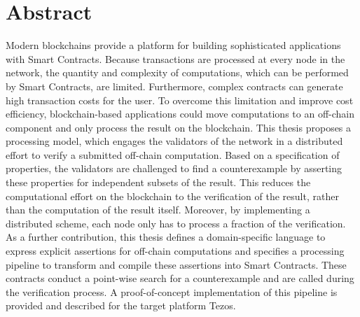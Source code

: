 \chapter*{Abstract}
Modern blockchains provide a platform for building sophisticated applications with Smart Contracts. Because transactions are processed at every node in the network, the quantity and complexity of computations, which can be performed by Smart Contracts, are limited. Furthermore, complex contracts can generate high transaction costs for the user. To overcome this limitation and improve cost efficiency, blockchain-based applications could move computations to an off-chain component and only process the result on the blockchain. This thesis proposes a processing model, which engages the validators of the network in a distributed effort to verify a submitted off-chain computation. Based on a specification of properties, the validators are challenged to find a counterexample by asserting these properties for independent subsets of the result. This reduces the computational effort on the blockchain to the verification of the result, rather than the computation of the result itself. Moreover, by implementing a distributed scheme, each node  only has to process a fraction of the verification. As a further contribution, this thesis defines a domain-specific language to express explicit assertions for off-chain computations and specifies a processing pipeline to transform and compile these assertions into Smart Contracts. These contracts conduct a point-wise search for a counterexample and are called during the verification process. A proof-of-concept implementation of this pipeline is provided and described for the target platform Tezos.